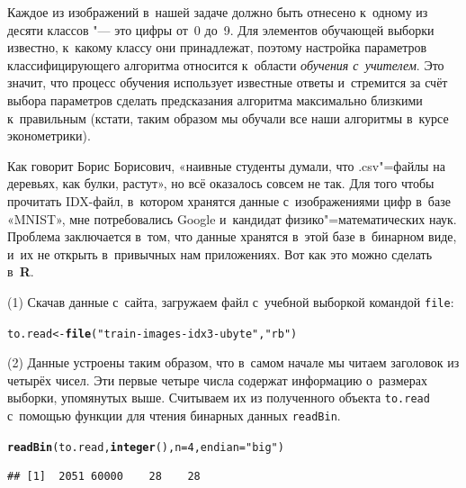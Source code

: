 \documentclass[final,pdftex]{../../template/epsilonj}\usepackage[]{graphicx}\usepackage[]{color}
\makeatletter
\newcommand{\hlnum}[1]{\textcolor[rgb]{0.686,0.059,0.569}{#1}}%
\newcommand{\hlstr}[1]{\textcolor[rgb]{0.192,0.494,0.8}{#1}}%
\newcommand{\hlstd}[1]{\textcolor[rgb]{0.345,0.345,0.345}{#1}}%
\newcommand{\hlkwb}[1]{\textcolor[rgb]{0.69,0.353,0.396}{#1}}%
\newcommand{\hlkwc}[1]{\textcolor[rgb]{0.333,0.667,0.333}{#1}}%
\newcommand{\hlkwd}[1]{\textcolor[rgb]{0.737,0.353,0.396}{\textbf{#1}}}%
\newenvironment{kframe}{%
 \def\at@end@of@kframe{}%
 \ifinner\ifhmode%
  \def\at@end@of@kframe{\end{minipage}}%
  \begin{minipage}{\columnwidth}%
 \fi\fi%
 \def\FrameCommand##1{\hskip\@totalleftmargin \hskip-\fboxsep
 \colorbox{shadecolor}{##1}\hskip-\fboxsep
     \hskip-\linewidth \hskip-\@totalleftmargin \hskip\columnwidth}%
 \MakeFramed {\advance\hsize-\width
   \@totalleftmargin\z@ \linewidth\hsize
   \@setminipage}}%
 {\par\unskip\endMakeFramed%
 \at@end@of@kframe}
\newenvironment{knitrout}{}{} %
\makeatother
\begin{document}
Каждое из изображений в~нашей задаче должно быть отнесено к~одному из десяти классов "--- это цифры от~0 до~9. 
Для элементов обучающей выборки известно, к~какому классу они принадлежат, поэтому настройка параметров классифицирующего алгоритма относится к~области \textit{обучения с~учителем}. 
Это значит, что процесс обучения использует известные ответы и~стремится за счёт выбора параметров сделать предсказания алгоритма максимально близкими к~правильным (кстати, таким образом мы обучали все наши алгоритмы в~курсе эконометрики).

Как говорит Борис Борисович, «наивные студенты думали, что .csv"=файлы на деревьях, как булки, растут», но всё оказалось совсем не так. 
Для того чтобы прочитать IDX-файл, в~котором хранятся данные с~изображениями цифр в~базе «MNIST», мне потребовались Google и~кандидат физико"=математических наук. 
Проблема заключается в~том, что данные хранятся в~этой базе в~бинарном виде, и~их не открыть в~привычных нам приложениях.
Вот как это можно сделать в~\textbf{R}.

\par\medskip
(1) Скачав данные с~сайта, загружаем файл с~учебной выборкой командой \texttt{file}:

\begin{knitrout}
\color{fgcolor}\begin{kframe}
\begin{alltt}
\hlstd{to.read} \hlkwb{<-} \hlkwd{file}\hlstd{(}\hlstr{"train-images-idx3-ubyte"}\hlstd{,} \hlstr{"rb"}\hlstd{)}
\end{alltt}
\end{kframe}
\end{knitrout}

\par\medskip (2) Данные устроены таким образом, что в~самом начале мы читаем заголовок из четырёх чисел. Эти первые четыре числа содержат информацию о~размерах выборки, упомянутых выше. Считываем их из полученного объекта \texttt{to.read} с~помощью функции для чтения бинарных данных \texttt{readBin}.

\begin{knitrout}
\color{fgcolor}\begin{kframe}
\begin{alltt}
\hlkwd{readBin}\hlstd{(to.read,} \hlkwd{integer}\hlstd{(),} \hlkwc{n} \hlstd{=} \hlnum{4}\hlstd{,} \hlkwc{endian}\hlstd{=}\hlstr{"big"}\hlstd{)}
\end{alltt}
\begin{verbatim}
## [1]  2051 60000    28    28
\end{verbatim}
\end{kframe}
\end{knitrout}
\end{document}
